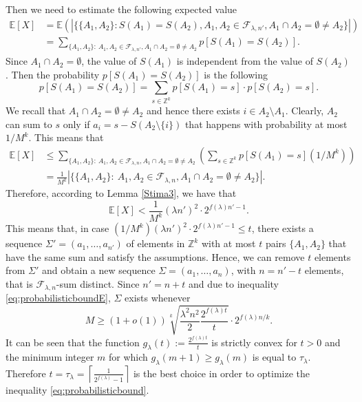 \documentclass[a4paper]{amsart}
\theoremstyle{plain}
\begin{document}
Then we need to estimate the following expected value
\begin{align*}
\mathbb{E}[X] & =\mathbb{E}(|\{\{A_1,A_2\}: S(A_1)=S(A_2), A_1,A_2\in \mathcal{F}_{\lambda,n'}, A_1\cap A_2=\emptyset\not= A_2\}|)\\
& = \sum_{\{A_1,A_2\}:\ A_1,A_2\in \mathcal{F}_{\lambda,n'}, A_1\cap A_2=\emptyset\not= A_2} p[S(A_1)=S(A_2)].
\end{align*}
Since $A_1\cap A_2=\emptyset$, the value of $S(A_1)$ is independent from the value of $S(A_2)$. Then the probability $p[S(A_1)=S(A_2)]$ is the following
$$p[S(A_1)=S(A_2)]=\sum_{s\in \mathbb{Z}^k} p[S(A_1)=s]\cdot p[S(A_2)=s].$$
We recall that $A_1\cap A_2=\emptyset\not= A_2$ and hence there exists $i\in A_2\setminus A_1$. Clearly, $A_2$ can sum to $s$ only if $a_i=s-S(A_2\setminus \{i\})$ that happens with probability at most $1/M^k$.
This means that
\begin{align*}
\mathbb{E}[X] & \leq \sum_{\{A_1,A_2\}:\ A_1,A_2\in \mathcal{F}_{\lambda,n}, A_1\cap A_2=\emptyset\not= A_2}\left (\sum_{s\in \mathbb{Z}^k}p[S(A_1)=s] (1/M^k)\right)	\\
& = \frac{1}{M^k}|\{\{A_1,A_2\}:\ A_1,A_2\in \mathcal{F}_{\lambda,n}, A_1\cap A_2=\emptyset\not= A_2\}|.
\end{align*}
Therefore, according to Lemma \ref{Stima3}, we have that
\begin{equation} \label{eq:probabilisticboundE}\mathbb{E}[X]< \frac{1}{M^k} (\lambda n')^2 \cdot 2^{f(\lambda) n' - 1}.\end{equation}
This means that, in case $(1 / M^k) (\lambda n')^2 \cdot 2^{f(\lambda) n' - 1} \leq t$, there exists a sequence $\Sigma'=(a_1,\dots,a_{n'})$ of elements in $\mathbb{Z}^k$ with at most $t$ pairs $\{A_1, A_2\}$ that have the same sum and satisfy the assumptions. Hence, we can remove $t$ elements from $\Sigma'$ and obtain a new sequence $\Sigma=(a_1,\dots,a_n)$, with $n = n' - t$ elements, that is $\mathcal{F}_{\lambda,n}$-sum distinct. Since $n'=n+t$ and due to inequality \eqref{eq:probabilisticboundE}, $\Sigma$ exists whenever
\begin{equation} \label{eq:probabilisticbound}
M \geq (1+o(1)) \sqrt[k]{\frac{\lambda^2 n^2}{2} \frac{2^{f(\lambda) t}}{t}} \cdot 2^{f(\lambda) n/k}.
\end{equation}
It can be seen that the function $g_{\lambda}(t) := \frac{2^{f(\lambda) t}}{t}$ is strictly convex for $t > 0$ and the minimum integer $m$ for which $g_{\lambda}(m+1) \geq g_{\lambda}(m)$ is equal to $\tau_{\lambda}$.  Therefore $t = \tau_{\lambda} = \left \lceil \frac{1}{2^{f(\lambda)}-1} \right \rceil$ is the best choice in order to optimize the inequality \eqref{eq:probabilisticbound}.
\endproof
\end{document}
